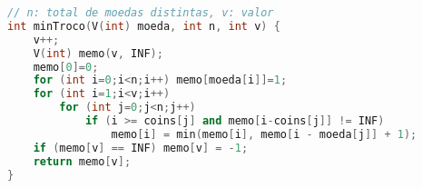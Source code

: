 \begin{lstlisting}[language = C++]
// n: total de moedas distintas, v: valor
int minTroco(V(int) moeda, int n, int v) {
	v++;
	V(int) memo(v, INF); 
	memo[0]=0;
    for (int i=0;i<n;i++) memo[moeda[i]]=1;
    for (int i=1;i<v;i++)
    	for (int j=0;j<n;j++)
        	if (i >= coins[j] and memo[i-coins[j]] != INF)
            	memo[i] = min(memo[i], memo[i - moeda[j]] + 1);
    if (memo[v] == INF) memo[v] = -1;
    return memo[v];
}
\end{lstlisting}
